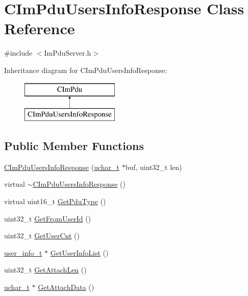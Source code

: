 \hypertarget{class_c_im_pdu_users_info_response}{}\section{C\+Im\+Pdu\+Users\+Info\+Response Class Reference}
\label{class_c_im_pdu_users_info_response}


{\ttfamily \#include $<$Im\+Pdu\+Server.\+h$>$}

Inheritance diagram for C\+Im\+Pdu\+Users\+Info\+Response\+:\begin{figure}[H]
\begin{center}
\leavevmode
\includegraphics[height=2.000000cm]{class_c_im_pdu_users_info_response}
\end{center}
\end{figure}
\subsection*{Public Member Functions}
\begin{DoxyCompactItemize}
\item 
\hyperlink{class_c_im_pdu_users_info_response_afe4741b2cef519892bafc3f6c257ca16}{C\+Im\+Pdu\+Users\+Info\+Response} (\hyperlink{base_2ostype_8h_a124ea0f8f4a23a0a286b5582137f0b8d}{uchar\+\_\+t} $\ast$buf, uint32\+\_\+t len)
\item 
virtual \hyperlink{class_c_im_pdu_users_info_response_ad309b905de65c31b8383035f298a0d5b}{$\sim$\+C\+Im\+Pdu\+Users\+Info\+Response} ()
\item 
virtual uint16\+\_\+t \hyperlink{class_c_im_pdu_users_info_response_adc7dd3ea3469f97a1b79e81231faba00}{Get\+Pdu\+Type} ()
\item 
uint32\+\_\+t \hyperlink{class_c_im_pdu_users_info_response_ae1f955fe65a9d16fde036545530268c5}{Get\+From\+User\+Id} ()
\item 
uint32\+\_\+t \hyperlink{class_c_im_pdu_users_info_response_a92abf5ef47d86ee7b56168cecb2c4c3b}{Get\+User\+Cnt} ()
\item 
\hyperlink{structuser__info__t}{user\+\_\+info\+\_\+t} $\ast$ \hyperlink{class_c_im_pdu_users_info_response_a92af458490a83556d9a0401c74c5a3cf}{Get\+User\+Info\+List} ()
\item 
uint32\+\_\+t \hyperlink{class_c_im_pdu_users_info_response_a34c859d327e227e1f5c556994cf8ce2d}{Get\+Attach\+Len} ()
\item 
\hyperlink{base_2ostype_8h_a124ea0f8f4a23a0a286b5582137f0b8d}{uchar\+\_\+t} $\ast$ \hyperlink{class_c_im_pdu_users_info_response_af55e09d7d87a60aa8f69825a999d0fe0}{Get\+Attach\+Data} ()
\end{DoxyCompactItemize}
